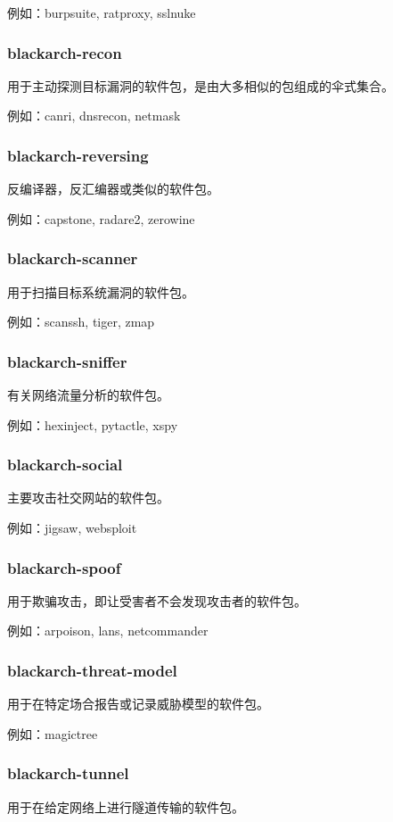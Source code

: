 \documentclass[a4paper, oneside, 11pt]{book}
\begin{document}
例如：burpsuite, ratproxy, sslnuke

\subsubsection{blackarch-recon}
用于主动探测目标漏洞的软件包，是由大多相似的包组成的伞式集合。

例如：canri, dnsrecon, netmask

\subsubsection{blackarch-reversing}
反编译器，反汇编器或类似的软件包。

例如：capstone, radare2, zerowine

\subsubsection{blackarch-scanner}
用于扫描目标系统漏洞的软件包。

例如：scanssh, tiger, zmap

\subsubsection{blackarch-sniffer}
有关网络流量分析的软件包。

例如：hexinject, pytactle, xspy

\subsubsection{blackarch-social}
主要攻击社交网站的软件包。

例如：jigsaw, websploit

\subsubsection{blackarch-spoof}
用于欺骗攻击，即让受害者不会发现攻击者的软件包。

例如：arpoison, lans, netcommander

\subsubsection{blackarch-threat-model}
用于在特定场合报告或记录威胁模型的软件包。

例如：magictree

\subsubsection{blackarch-tunnel}
用于在给定网络上进行隧道传输的软件包。
\end{document}
